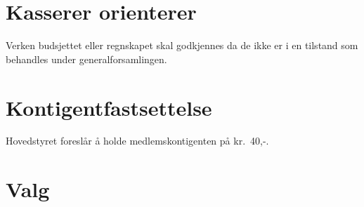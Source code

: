 \documentclass[10pt,norsk,a4paper]{article}
\begin{document}
\newpage

\section{Kasserer orienterer}
Verken budsjettet eller regnskapet skal godkjennes da
de ikke er i en tilstand som behandles under generalforsamlingen.

\section{Kontigentfastsettelse}
Hovedstyret foreslår å holde medlemskontigenten på kr.~40,-.

\newpage

\section{Valg}
\end{document}
